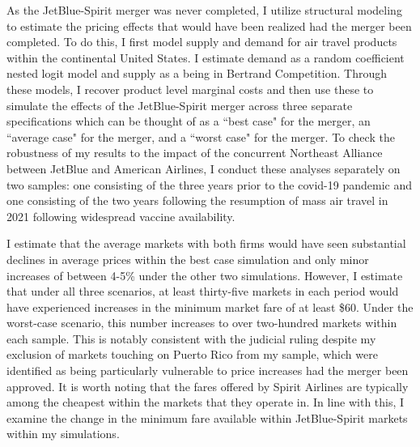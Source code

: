 \documentclass{article}
\begin{document}
    As the JetBlue-Spirit merger was never completed, I utilize structural modeling to estimate the pricing effects that would have been realized had the merger been completed. To do this, I first model supply and demand for air travel products within the continental United States. I estimate demand as a random coefficient nested logit model and supply as a being in Bertrand Competition. Through these models, I recover product level marginal costs and then use these to simulate the effects of the JetBlue-Spirit merger across three separate specifications which can be thought of as a ``best case" for the merger, an ``average case" for the merger, and a ``worst case" for the merger. To check the robustness of my results to the impact of the concurrent Northeast Alliance between JetBlue and American Airlines, I conduct these analyses separately on two samples: one consisting of the three years prior to the covid-19 pandemic and one consisting of the two years following the resumption of mass air travel in 2021 following widespread vaccine availability. 

    I estimate that the average markets with both firms would have seen substantial declines in average prices within the best case simulation and only minor increases of between 4-5\% under the other two simulations. However, I estimate that under all three scenarios, at least thirty-five markets in each period would have experienced increases in the minimum market fare of at least \$60. Under the worst-case scenario, this number increases to over two-hundred markets within each sample. This is notably consistent with the judicial ruling despite my exclusion of markets touching on Puerto Rico from my sample, which were identified as being particularly vulnerable to price increases had the merger been approved. It is worth noting that the fares offered by Spirit Airlines are typically among the cheapest within the markets that they operate in. In line with this, I examine the change in the minimum fare available within JetBlue-Spirit markets within my simulations.

\end{document}
